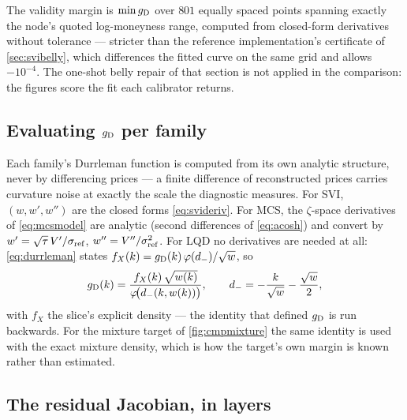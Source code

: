 The validity margin is $\min g_{\rm D}$ over $801$ equally spaced
points spanning exactly the node's quoted log-moneyness range,
computed from closed-form derivatives without tolerance --- stricter
than the reference implementation's certificate of
\cref{sec:svibelly}, which differences the fitted curve on the same
grid and allows $-10^{-4}$.  The one-shot belly repair of that section
is not applied in the comparison: the figures score the fit each
calibrator returns.

\subsection*{Evaluating $g_{\rm D}$ per family}

Each family's Durrleman function is computed from its own analytic
structure, never by differencing prices --- a finite difference of
reconstructed prices carries curvature noise at exactly the scale the
diagnostic measures.  For SVI, $(w,w',w'')$ are the closed forms
\eqref{eq:svideriv}.  For MCS, the $\zeta$-space derivatives of
\eqref{eq:mcsmodel} are analytic (second differences of
\eqref{eq:acosh}) and convert by $w'=\sqrt\tau\,V'/\sigma_{\rm ref}$,
$w''=V''/\sigma_{\rm ref}^2$.  For LQD no derivatives are needed at
all: \eqref{eq:durrleman} states
$f_X(k)=g_{\rm D}(k)\,\varphi(d_-)/\sqrt{w}$, so
\[
g_{\rm D}(k)=\frac{f_X(k)\,\sqrt{w(k)}}{\varphi\!\big(d_-(k,w(k))\big)},
\qquad d_-=-\frac{k}{\sqrt w}-\frac{\sqrt w}{2},
\]
with $f_X$ the slice's explicit density --- the identity that defined
$g_{\rm D}$ is run backwards.  For the mixture target of
\cref{fig:cmpmixture} the same identity is used with the exact mixture
density, which is how the target's own margin is known rather than
estimated.

\subsection*{The residual Jacobian, in layers}
\label{sec:svijacobian}

